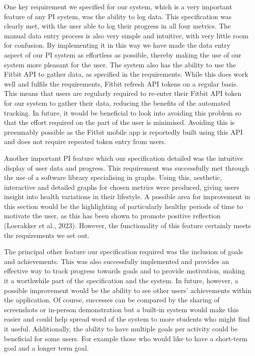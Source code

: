 \documentclass[12pt]{article}
\begin{document}
One key requirement we specified for our system, which is a very important 
feature of any PI system, was the ability to log data. This specification was 
clearly met, with the user able to log their progress in all four metrics. The 
manual data entry process is also very simple and intuitive, with very little 
room for confusion. By implementing it in this way we have made the data entry 
aspect of our PI system as effortless as possible, thereby making the use of 
our system more pleasant for the user. The system also has the ability to use 
the Fitbit API to gather data, as specified in the requirements. While this 
does work well and fulfils the requirements, Fitbit refresh API tokens on a 
regular basis. This means that users are regularly required to re-enter their 
Fitbit API token for our system to gather their data, reducing the benefits of 
the automated tracking. In future, it would be beneficial to look into 
avoiding this problem so that the effort required on the part of the user is 
minimised. Avoiding this is presumably possible as the Fitbit mobile app is 
reportedly built using this API and does not require repeated token entry from 
users.\par

Another important PI feature which our specification detailed was the 
intuitive display of user data and progress. This requirement was successfully 
met through the use of a software library specialising in graphs. Using this, 
aesthetic, interactive and detailed graphs for chosen metrics were produced, 
giving users insight into health variations in their lifestyle. A possible 
area for improvement in this section would be the highlighting of particularly 
healthy periods of time to motivate the user, as this has been shown to promote 
positive reflection (Loerakker et al., 2023). However, the functionality of 
this feature certainly meets the requirements we set out.\par

The principal other feature our specification required was the inclusion of 
goals and achievements. This was also successfully implemented and provides 
an effective way to track progress towards goals and to provide motivation, 
making it a worthwhile part of the specification and the system. In future, 
however, a possible improvement would be the ability to see other users' 
achievements within the application. Of course, successes can be compared by 
the sharing of screenshots or in-person demonstration but a built-in system 
would make this easier and could help spread word of the system to more 
students who might find it useful. Additionally, the ability to have multiple 
goals per activity could be beneficial for some users. For example those who 
would like to have a short-term goal and a longer term goal.\par
\end{document}
